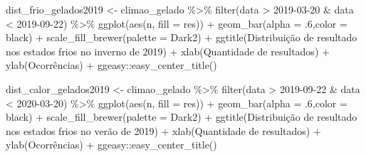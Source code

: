 \documentclass[
]{article}
\newenvironment{Shaded}{\begin{snugshade}}{\end{snugshade}}
\newcommand{\AttributeTok}[1]{\textcolor[rgb]{0.77,0.63,0.00}{#1}}
\newcommand{\DecValTok}[1]{\textcolor[rgb]{0.00,0.00,0.81}{#1}}
\newcommand{\FunctionTok}[1]{\textcolor[rgb]{0.00,0.00,0.00}{#1}}
\newcommand{\NormalTok}[1]{#1}
\newcommand{\OtherTok}[1]{\textcolor[rgb]{0.56,0.35,0.01}{#1}}
\newcommand{\SpecialCharTok}[1]{\textcolor[rgb]{0.00,0.00,0.00}{#1}}
\newcommand{\StringTok}[1]{\textcolor[rgb]{0.31,0.60,0.02}{#1}}
\begin{document}
\begin{Shaded}
\begin{Highlighting}[]
\NormalTok{dist\_frio\_gelados2019 }\OtherTok{\textless{}{-}}\NormalTok{ climao\_gelado }\SpecialCharTok{\%\textgreater{}\%} 
  \FunctionTok{filter}\NormalTok{(data }\SpecialCharTok{\textgreater{}} \StringTok{\textquotesingle{}2019{-}03{-}20\textquotesingle{}} \SpecialCharTok{\&}\NormalTok{ data }\SpecialCharTok{\textless{}} \StringTok{\textquotesingle{}2019{-}09{-}22\textquotesingle{}}\NormalTok{) }\SpecialCharTok{\%\textgreater{}\%}
  \FunctionTok{ggplot}\NormalTok{(}\FunctionTok{aes}\NormalTok{(n, }\AttributeTok{fill =}\NormalTok{ res)) }\SpecialCharTok{+} 
  \FunctionTok{geom\_bar}\NormalTok{(}\AttributeTok{alpha =}\NormalTok{ .}\DecValTok{6}\NormalTok{,}\AttributeTok{color =} \StringTok{\textquotesingle{}black\textquotesingle{}}\NormalTok{) }\SpecialCharTok{+} 
  \FunctionTok{scale\_fill\_brewer}\NormalTok{(}\AttributeTok{palette =} \StringTok{\textquotesingle{}Dark2\textquotesingle{}}\NormalTok{) }\SpecialCharTok{+}
  \FunctionTok{ggtitle}\NormalTok{(}\StringTok{\textquotesingle{}Distribuição de resultado nos estados frios no inverno de 2019\textquotesingle{}}\NormalTok{) }\SpecialCharTok{+}
  \FunctionTok{xlab}\NormalTok{(}\StringTok{\textquotesingle{}Quantidade de resultados\textquotesingle{}}\NormalTok{) }\SpecialCharTok{+} \FunctionTok{ylab}\NormalTok{(}\StringTok{\textquotesingle{}Ocorrências\textquotesingle{}}\NormalTok{) }\SpecialCharTok{+}
\NormalTok{  ggeasy}\SpecialCharTok{::}\FunctionTok{easy\_center\_title}\NormalTok{()}

\NormalTok{dist\_calor\_gelados2019 }\OtherTok{\textless{}{-}}\NormalTok{ climao\_gelado }\SpecialCharTok{\%\textgreater{}\%} 
  \FunctionTok{filter}\NormalTok{(data }\SpecialCharTok{\textgreater{}} \StringTok{\textquotesingle{}2019{-}09{-}22\textquotesingle{}} \SpecialCharTok{\&}\NormalTok{ data }\SpecialCharTok{\textless{}} \StringTok{\textquotesingle{}2020{-}03{-}20\textquotesingle{}}\NormalTok{) }\SpecialCharTok{\%\textgreater{}\%}
  \FunctionTok{ggplot}\NormalTok{(}\FunctionTok{aes}\NormalTok{(n, }\AttributeTok{fill =}\NormalTok{ res)) }\SpecialCharTok{+} 
  \FunctionTok{geom\_bar}\NormalTok{(}\AttributeTok{alpha =}\NormalTok{ .}\DecValTok{6}\NormalTok{,}\AttributeTok{color =} \StringTok{\textquotesingle{}black\textquotesingle{}}\NormalTok{) }\SpecialCharTok{+} 
  \FunctionTok{scale\_fill\_brewer}\NormalTok{(}\AttributeTok{palette =} \StringTok{\textquotesingle{}Dark2\textquotesingle{}}\NormalTok{) }\SpecialCharTok{+}
  \FunctionTok{ggtitle}\NormalTok{(}\StringTok{\textquotesingle{}Distribuição de resultado nos estados frios no verão de 2019\textquotesingle{}}\NormalTok{) }\SpecialCharTok{+}
  \FunctionTok{xlab}\NormalTok{(}\StringTok{\textquotesingle{}Quantidade de resultados\textquotesingle{}}\NormalTok{) }\SpecialCharTok{+} \FunctionTok{ylab}\NormalTok{(}\StringTok{\textquotesingle{}Ocorrências\textquotesingle{}}\NormalTok{) }\SpecialCharTok{+}
\NormalTok{  ggeasy}\SpecialCharTok{::}\FunctionTok{easy\_center\_title}\NormalTok{()}



\end{Highlighting}
\end{Shaded}
\end{document}

